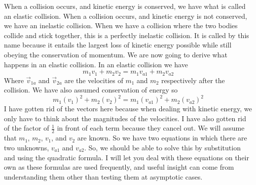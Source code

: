 \documentclass{article}[gray]
\numberwithin{equation}{subsection}
\begin{document}
When a collision occurs, and kinetic energy is conserved, we have what is called an elastic collision. When a collision occurs, and kinetic energy is not conserved, we have an inelastic collision. When we have a collision where the two bodies collide and stick together, this is a perfectly inelastic collision. It is called by this name because it entails the largest loss of kinetic energy possible while still obeying the conservation of momentum. We are now going to derive what happens in an elastic collision. In an elastic collision we have \begin{equation}m_1 v_1+m_2 v_2=m_1v_{a1}+m_2v_{a2}\end{equation} Where $\vec{v}_{1a}$ and $\vec{v}_{2a}$ are the velocities of $m_1$ and $m_2$ respectively after the collision. We have also assumed conservation of energy so \begin{equation}m_1\left(v_1\right)^2+m_2\left(v_2\right)^2=m_1\left(v_{a1}\right)^2+m_2\left(v_{a2}\right)^2\end{equation} I have gotten rid of the vectors here because when dealing with kinetic energy, we only have to think about the magnitudes of the velocities. I have also gotten rid of the factor of $\frac{1}{2}$ in front of each term because they cancel out. We will assume that $m_1$, $m_2$, $v_1$, and $v_2$ are known. So we have two equations in which there are two unknowns, $v_{a1}$ and $v_{a2}$. So, we should be able to solve this by substitution and using the quadratic formula. I will let you deal with these equations on their own as these formulas are used frequently, and useful insight can come from understanding them other than testing them at asymptotic cases. 
\end{document}

